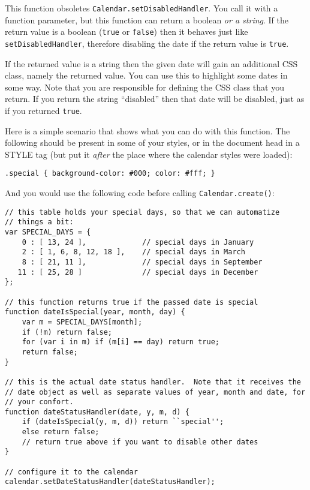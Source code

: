 \documentclass[a4paper,10pt]{article}
\begin{document}
This function obsoletes \texttt{Calendar.setDisabledHandler}.  You call it with
a function parameter, but this function can return a boolean
\emph{or a string}.  If the return value is a boolean (\texttt{true} or
\texttt{false}) then it behaves just like \texttt{setDisabledHandler},
therefore disabling the date if the return value is \texttt{true}.

If the returned value is a string then the given date will gain an additional
CSS class, namely the returned value.  You can use this to highlight some dates
in some way.  Note that you are responsible for defining the CSS class that you
return.  If you return the string ``disabled'' then that date will be disabled,
just as if you returned \texttt{true}.

Here is a simple scenario that shows what you can do with this function.  The
following should be present in some of your styles, or in the document head in
a STYLE tag (but put it \emph{after} the place where the calendar styles were
loaded):

\begin{verbatim}
.special { background-color: #000; color: #fff; }
\end{verbatim}

And you would use the following code before calling \texttt{Calendar.create()}:

\begin{verbatim}
// this table holds your special days, so that we can automatize
// things a bit:
var SPECIAL_DAYS = {
    0 : [ 13, 24 ],             // special days in January
    2 : [ 1, 6, 8, 12, 18 ],    // special days in March
    8 : [ 21, 11 ],             // special days in September
   11 : [ 25, 28 ]              // special days in December
};

// this function returns true if the passed date is special
function dateIsSpecial(year, month, day) {
    var m = SPECIAL_DAYS[month];
    if (!m) return false;
    for (var i in m) if (m[i] == day) return true;
    return false;
}

// this is the actual date status handler.  Note that it receives the
// date object as well as separate values of year, month and date, for
// your confort.
function dateStatusHandler(date, y, m, d) {
    if (dateIsSpecial(y, m, d)) return ``special'';
    else return false;
    // return true above if you want to disable other dates
}

// configure it to the calendar
calendar.setDateStatusHandler(dateStatusHandler);
\end{verbatim}
\end{document}
